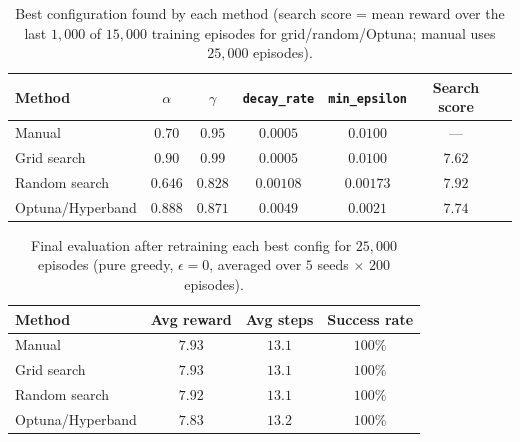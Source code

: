 \documentclass[11pt]{article}
\begin{document}
\begin{table}[h]
\centering
\begin{tabular}{@{}lcccccc@{}}
\toprule
\textbf{Method} & $\alpha$ & $\gamma$ & \texttt{decay\_rate} & \texttt{min\_epsilon} & \textbf{Search score} \\
\midrule
Manual          & $0.70$ & $0.95$ & $0.0005$  & $0.0100$  & --- \\
Grid search     & $0.90$ & $0.99$ & $0.0005$  & $0.0100$  & $7.62$ \\
Random search   & $0.646$& $0.828$& $0.00108$ & $0.00173$ & $7.92$ \\
Optuna/Hyperband& $0.888$& $0.871$& $0.0049$  & $0.0021$  & $7.74$ \\
\bottomrule
\end{tabular}
\caption{Best configuration found by each method (search score = mean reward over the last
$1{,}000$ of $15{,}000$ training episodes for grid/random/Optuna; manual uses $25{,}000$ episodes).}
\label{tab:search}
\end{table}

\begin{table}[h]
\centering
\begin{tabular}{@{}lccc@{}}
\toprule
\textbf{Method} & \textbf{Avg reward} & \textbf{Avg steps} & \textbf{Success rate} \\
\midrule
Manual           & $\mathbf{7.93}$ & $\mathbf{13.1}$ & $100\%$ \\
Grid search      & $\mathbf{7.93}$ & $\mathbf{13.1}$ & $100\%$ \\
Random search    & $7.92$ & $13.1$ & $100\%$ \\
Optuna/Hyperband & $7.83$ & $13.2$ & $100\%$ \\
\bottomrule
\end{tabular}
\caption{Final evaluation after retraining each best config for $25{,}000$ episodes
(pure greedy, $\epsilon = 0$, averaged over $5$ seeds $\times$ $200$ episodes).}
\label{tab:final}
\end{table}
\end{document}
